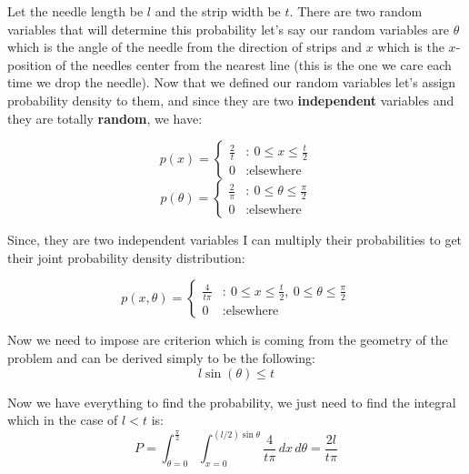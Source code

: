 \documentclass[12pt,letterpaper]{article}
\begin{document}
Let the needle length be $l$ and the strip width be $t$. There are two random variables that will determine this probability let's say our random variables are $\theta$ which is the angle of the needle from the direction of strips and $x$ which is the $x$-position of the needles center from the nearest line (this is the one we care each time we drop the needle). Now that we defined our random variables let's assign probability density to them, and since they are two \textbf{independent} variables and they are totally \textbf{random}, we have: 


\begin{multicols}{2}
\noindent
\begin{equation*}
 p(x) = \begin{cases}
 \frac{2}{t} &:\ 0 \le x \le \frac{t}{2}\\
 0 &: \text{elsewhere}
 \end{cases}
\end{equation*}
\begin{equation*}
p(\theta)=
\begin{cases}
\frac{2}{\pi} &:\ 0 \le \theta \le \frac{\pi}{2}\\
0 &: \text{elsewhere}
\end{cases}
\end{equation*}
\end{multicols}

Since, they are two independent variables I can multiply their probabilities to get their joint probability density distribution: 

\begin{equation*}
p(x,\theta)=
\begin{cases}
\frac{4}{t\pi} &:\ 0 \le x \le \frac{t}{2} , \ 0 \le \theta \le \frac{\pi}{2}\\
 0 &: \text{elsewhere}
\end{cases}
\end{equation*}

Now we need to impose are criterion which is coming from the geometry of the problem and can be derived simply to be the following:
\begin{equation*}
l \sin(\theta) \leq t
\end{equation*}

Now we have everything to find the probability, we just need to find the integral which in the case of $l<t$ is:
\begin{equation*}
 P=\int _{\theta =0}^{\frac {\pi }{2}}\int _{x=0}^{(l/2)\sin \theta }{\frac {4}{t\pi }}\,dx\,d\theta ={\frac {2l}{t\pi }}
\end{equation*}
\end{document}

